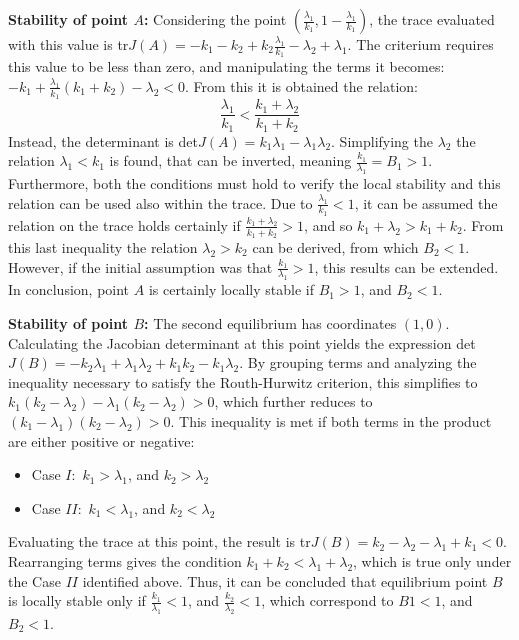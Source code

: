 \textbf{Stability of point $A$:} Considering the point $(\frac{\lambda_1}{k_1}, 1-\frac{\lambda_1}{k_1})$, the trace evaluated with this value is tr$J(A) = - k_1 - k_2 +k_2 \frac{\lambda_1}{k_1} - \lambda_2 + \lambda_1$. The criterium requires this value to be less than zero, and manipulating the terms it becomes: $-k_1 + \frac{\lambda_1}{k_1}( k_1 + k_2) - \lambda_2 < 0$. From this it is obtained the relation:
\[\frac{\lambda_1}{k_1} < \frac{k_1 + \lambda_2}{k_1 + k_2} \]
Instead, the determinant is det$J(A) = k_1 \lambda_1 - \lambda_1 \lambda_2$. Simplifying the $\lambda_2$ the relation $\lambda_1 < k_1$ is found, that can be inverted, meaning $\frac{k_1}{\lambda_1} = B_1 > 1$.
Furthermore, both the conditions must hold to verify the local stability and this relation can be used also within the trace. Due to $\frac{\lambda_1}{k_1} < 1$, it can be assumed the relation on the trace holds certainly if $\frac{k_1 + \lambda_2}{k_1 + k_2} > 1$, and so $k_1 + \lambda_2 > k_1 + k_2$. From this last inequality the relation $\lambda_2 > k_2$ can be derived, from which $B_2 < 1$. However, if the initial assumption was that $ \frac{k_1 }{\lambda_1} > 1$, this results can be extended.
In conclusion, point $A$ is certainly locally stable if $B_1 > 1$, and $B_2 < 1$.  
 
\textbf{Stability of point $B$:} The second equilibrium has coordinates $(1,0)$. Calculating the Jacobian determinant at this point yields the expression det$J(B)= - k_2 \lambda_1 + \lambda_1 \lambda_2 + k_1 k_2 - k_1 \lambda_2$. By grouping terms and analyzing the inequality necessary to satisfy the Routh-Hurwitz criterion, this simplifies to $k_1 (k_2 - \lambda_2) - \lambda_1(k_2 - \lambda_2) > 0$, which further reduces to $(k_1 - \lambda_1) (k_2 - \lambda_2) >0$.
This inequality is met if both terms in the product are either positive or negative:
\begin{itemize}
	\item Case $I:$ $k_1 > \lambda_1$, and $k_2 > \lambda_2$
	\item Case $II:$ $k_1 < \lambda_1$, and $k_2 < \lambda_2$
\end{itemize}
Evaluating the trace at this point, the result is tr$J(B) = k_2 - \lambda_2 - \lambda_1 + k_1 < 0 $. Rearranging terms gives the condition $k_1 + k_2 < \lambda_1 + \lambda_2$, which is true only under the Case $II$ identified above. 
Thus, it can be concluded that equilibrium point $B$ is locally stable only if $\frac{k_1}{\lambda_1} <1$, and  $\frac{k_2}{\lambda_2} <1$, which correspond to $B1 < 1$, and $B_2 <1$.

